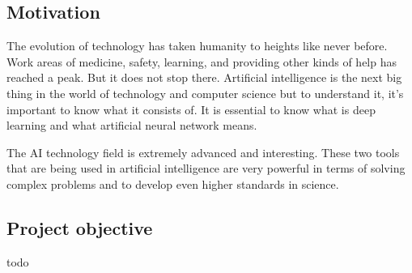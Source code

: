 \documentclass[../Main.tex]{subfiles}
\begin{document}
\subsection{Motivation}
The evolution of technology has taken humanity to heights like never before. Work areas of medicine, safety, learning, and providing other kinds of help has reached a peak. But it does not stop there. Artificial intelligence is the next big thing in the world of technology and computer science but to understand it, it’s important to know what it consists of. It is essential to know what is deep learning and what artificial neural network means.

The AI technology field is extremely advanced and interesting. These two tools that are being used in artificial intelligence are very powerful in terms of solving complex problems and to develop even higher standards in science.


\subsection{Project objective}

todo

\newpage
\end{document}
